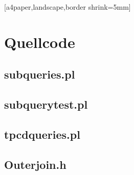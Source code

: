 %
% 
%







\newpage

[a4paper,landscape,border shrink=5mm]
  \chapter{Quellcode}
  \section{subqueries.pl}
  
  \newpage
  \section{subquerytest.pl}
  
  \newpage
  \section{tpcdqueries.pl}
  
  \newpage
  \section{Outerjoin.h}
  
%  

%

%
%
%